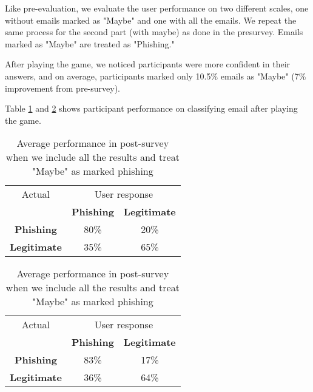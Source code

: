 Like pre-evaluation, we evaluate the user performance on two different scales, one without emails marked as "Maybe" and one with all the emails. We repeat the same process for the second part (with maybe) as done in the presurvey. Emails marked as "Maybe" are treated as "Phishing."

After playing the game, we noticed participants were more confident in their answers, and on average, participants marked only 10.5\% emails as "Maybe" (7\% improvement from pre-survey).

Table \ref{tab:post_survey_responses} and \ref{tab:post_survey_responses_all} shows participant performance on classifying email after playing the game.


\begin{table}[!ht]
    \begin{center}

        \begin{tabular}{c | c c}
            Actual              & \multicolumn{2}{c}{User response}                       \\
                                & \textbf{Phishing}                 & \textbf{Legitimate} \\
            \textbf{Phishing}   & 80\%                              & 20\%                \\
            \textbf{Legitimate} & 35\%                              & 65\%                \\
        \end{tabular}
        \caption{Average performance in post-survey when we include all the results and treat "Maybe" as marked phishing}
        \label{tab:post_survey_responses}
    \end{center}
\end{table}


\begin{table}[!ht]
    \begin{center}

        \begin{tabular}{c | c c}
            Actual              & \multicolumn{2}{c}{User response}                       \\
                                & \textbf{Phishing}                 & \textbf{Legitimate} \\
            \textbf{Phishing}   & 83\%                              & 17\%                \\
            \textbf{Legitimate} & 36\%                              & 64\%                \\
        \end{tabular}
        \caption{Average performance in post-survey when we include all the results and treat "Maybe" as marked phishing}
        \label{tab:post_survey_responses_all}
    \end{center}
\end{table}

